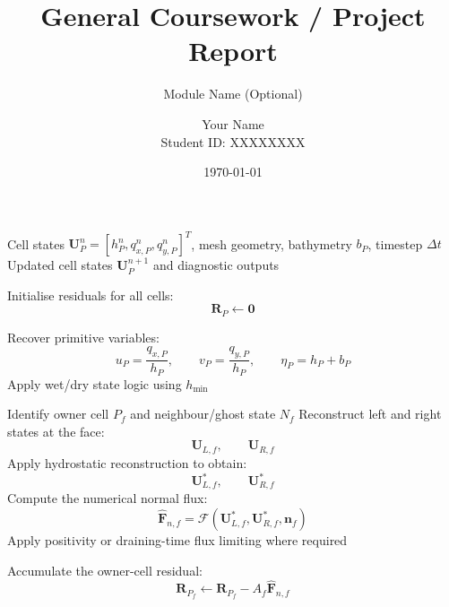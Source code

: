 \documentclass[11pt]{article}
\title{General Coursework / Project Report}
\subtitle{Module Name (Optional)}
\author{Your Name \\ Student ID: XXXXXXXX}
\date{\today}
\begin{document}
\maketitle
\tableofcontents
\newpage
{}

\begin{algorithm}[h!]
  \caption{Face-Based Finite-Volume Solver Loop for a General Shallow-Water Mesh}
  \label{alg:fv_solver_loop}
  \begin{algorithmic}[1]
      \Require Cell states $\mathbf{U}_P^n = [h_P^n, q_{x,P}^n, q_{y,P}^n]^T$, mesh geometry, bathymetry $b_P$, timestep $\Delta t$
      \Ensure Updated cell states $\mathbf{U}_P^{n+1}$ and diagnostic outputs

      \State Initialise residuals for all cells:
      \[
          \mathbf{R}_P \gets \mathbf{0}
          \label{eq:init_residual}
      \]

          \State Recover primitive variables:
          \[
              u_P =
              \frac{q_{x,P}}{h_P},
              \qquad
              v_P =
              \frac{q_{y,P}}{h_P},
              \qquad
              \eta_P =
              h_P + b_P
              \label{eq:primitive_recovery_algorithm}
          \]
          \State Apply wet/dry state logic using $h_{\min}$
      \EndFor

          \State Identify owner cell $P_f$ and neighbour/ghost state $N_f$
          \State Reconstruct left and right states at the face:
          \[
              \mathbf{U}_{L,f},
              \qquad
              \mathbf{U}_{R,f}
              \label{eq:face_reconstructed_states}
          \]
          \State Apply hydrostatic reconstruction to obtain:
          \[
              \mathbf{U}_{L,f}^{*},
              \qquad
              \mathbf{U}_{R,f}^{*}
              \label{eq:hydrostatic_reconstructed_states_algorithm}
          \]
          \State Compute the numerical normal flux:
          \[
              \widehat{\mathbf{F}}_{n,f}
              =
              \mathcal{F}
              \left(
                  \mathbf{U}_{L,f}^{*},
                  \mathbf{U}_{R,f}^{*},
                  \mathbf{n}_f
              \right)
              \label{eq:numerical_normal_flux_algorithm}
          \]
          \State Apply positivity or draining-time flux limiting where required

          \State Accumulate the owner-cell residual:
          \[
              \mathbf{R}_{P_f}
              \gets
              \mathbf{R}_{P_f}
              -
              A_f\widehat{\mathbf{F}}_{n,f}
              \label{eq:owner_residual_update_algorithm}
          \]


\end{algorithmic}
\end{algorithm}
\end{document}
